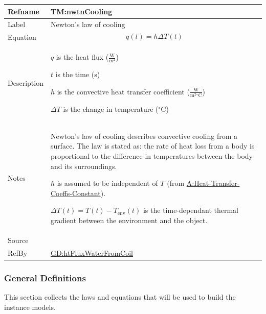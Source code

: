 \documentclass[12pt]{article}
\begin{document}
\begin{minipage}{\textwidth}
\begin{tabular}{>{\raggedright}p{}>{\raggedright\arraybackslash}p{}}
\toprule \textbf{Refname} & \textbf{TM:nwtnCooling}
\label{TM:nwtnCooling}
\\ \midrule
Label & Newton's law of cooling
        
\\ \midrule
Equation & \begin{displaymath}
           q\left(t\right)=h ΔT\left(t\right)
           \end{displaymath}
\\ \midrule
Description & \begin{symbDescription}
              \item{$q$ is the heat flux ($\frac{\text{W}}{\text{m}^{2}}$)}
              \item{$t$ is the time (${\text{s}}$)}
              \item{$h$ is the convective heat transfer coefficient ($\frac{\text{W}}{\text{m}^{2}{}^{\circ}\text{C}}$)}
              \item{$ΔT$ is the change in temperature (${{}^{\circ}\text{C}}$)}
              \end{symbDescription}
\\ \midrule
Notes & Newton's law of cooling describes convective cooling from a surface. The law is stated as: the rate of heat loss from a body is proportional to the difference in temperatures between the body and its surroundings.
        
        $h$ is assumed to be independent of $T$ (from \hyperref[assumpHTCC]{A:Heat-Transfer-Coeffs-Constant}).
        
        $ΔT\left(t\right)=T\left(t\right)-{T_{\text{env}}}\left(t\right)$ is the time-dependant thermal gradient between the environment and the object.
        
\\ \midrule
Source & \cite[(pg. 8)]{incroperaEtAl2007}
         
\\ \midrule
RefBy & \hyperref[GD:htFluxWaterFromCoil]{GD:htFluxWaterFromCoil}
        
\\ \bottomrule
\end{tabular}
\end{minipage}
\subsubsection{General Definitions}
\label{Sec:GDs}
This section collects the laws and equations that will be used to build the instance models.
\end{document}
